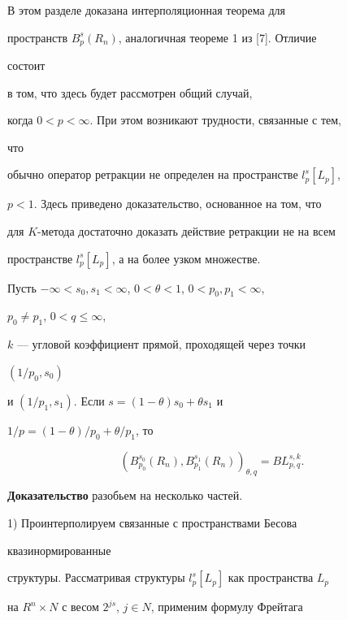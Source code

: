  


В этом разделе доказана интерполяционная теорема для 


пространств $B^s_p(R_n)$, аналогичная теореме 1 из [7]. Отличие 


состоит 


в том, что здесь будет рассмотрен общий случай,  


когда $0<p<\infty$. При этом возникают трудности, связанные с тем, 


что  


обычно оператор ретракции не определен на пространстве $l^s_p[L_p]$,  


$p<1$. Здесь приведено доказательство, основанное на том, что 


для $K$-метода достаточно доказать действие ретракции не на всем  


пространстве $l^s_p[L_p]$, а на более узком множестве.


 


\begin{thm} 


Пусть $-\infty<s_0,s_1<\infty$, $0<\theta<1$, $0<p_0,p_1<\infty$, 


$p_0\ne p_1$, $0<q\le\infty$, 


$k$ --- угловой коэффициент прямой, проходящей через точки 


$(1/p_0,s_0)$ 


и $(1/p_1,s_1)$. Если $s=(1-\theta)s_0+\theta s_1$ и 


$1/p=(1-\theta)/p_0+\theta/p_1$, то 


$$ 


(B^{s_0}_{p_0}(R_n),B^{s_1}_{p_1}(R_n))_{\theta,q}=BL^{s,k}_{p,q}. 


$$ 


\end{thm} 


 


{\bf Доказательство} разобьем на несколько частей. 


 


1) Проинтерполируем связанные с пространствами Бесова 


квазинормированные 


структуры. Рассматривая структуры $l^s_p[L_p]$ как пространства $L_p$ 


на $R^n\times N$ с весом $2^{js}$, $j\in N$, применим формулу Фрейтага 


